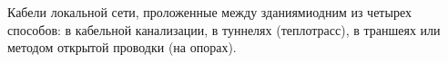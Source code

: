 Кабели локальной сети, проложенные между зданиямиодним из четырех способов: в
кабельной канализации, в туннелях (теплотрасс), в траншеях или 
методом открытой проводки (на опорах).